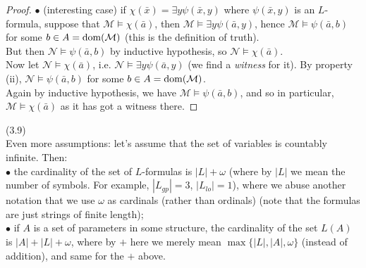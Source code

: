 \documentclass[a4paper]{article}
\begin{document}
\begin{lemma}
\begin{proof}
        $\bullet$ (interesting case) if $\chi(\bar{x}) = \exists y \psi(\bar{x},y)$ where $\psi(\bar{x},y)$ is an $L$-formula, suppose that $\mathcal{M} \vDash \chi(\bar{a})$, then $\mathcal{M} \vDash \exists y \psi(\bar{a},y)$, hence $\mathcal{M} \vDash \psi(\bar{a},b)$ for some $b \in A = \operatorname{dom} (\mathcal{M})$ (this is the definition of truth).\\
        But then $\mathcal{N} \vDash \psi(\bar{a},b)$ by inductive hypothesis, so $\mathcal{N} \vDash \chi(\bar{a})$.\\
        Now let $\mathcal{N} \vDash \chi(\bar{a})$, i.e. $\mathcal{N} \vDash \exists y \psi (\bar{a},y)$ (we find a \emph{witness} for it). By property (ii), $\mathcal{N} \vDash \psi(\bar{a},b)$ for some $b \in A = \operatorname{dom}(\mathcal{M})$.\\
        Again by inductive hypothesis, we have $\mathcal{M} \vDash \psi(\bar{a},b)$, and so in particular, $\mathcal{M} \vDash \chi(\bar{a})$ as it has got a witness there.
    \end{proof}
\end{lemma}

\begin{rem} (3.9)\\
    Even more assumptions: let's assume that the set of variables is countably infinite. Then:\\
    $\bullet$ the cardinality of the set of $L$-formulas is $|L|+\omega$ (where by $|L|$ we mean the number of symbols. For example, $|L_{gp}| = 3$, $|L_{lo}| = 1$), where we abuse another notation that we use $\omega$ as cardinals (rather than ordinals) (note that the formulas are just strings of finite length);\\
    $\bullet$ if $A$ is a set of parameters in some structure, the cardinality of the set $L(A)$ is $|A|+|L|+\omega$, where by $+$ here we merely mean $\max\{|L|,|A|,\omega\}$ (instead of addition), and same for the $+$ above.
\end{rem}
\end{document}
